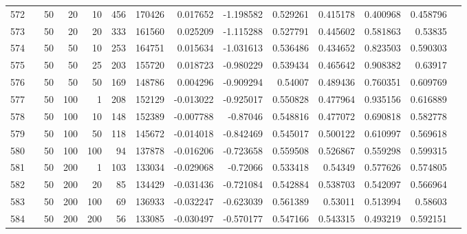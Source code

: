 \begin{longtable}{llrrrrrrrrrrrr}
		572 & &           50 &                20 &           10 &         456 &     170426 &  0.017652 & -1.198582 &  0.529261 &    0.415178 &       0.400968 &  0.458796 \\
		573 & &           50 &                20 &           20 &         333 &     161560 &  0.025209 & -1.115288 &  0.527791 &    0.445602 &       0.581863 &   0.53835 \\
		574 & &           50 &                50 &           10 &         253 &     164751 &  0.015634 & -1.031613 &  0.536486 &    0.434652 &       0.823503 &  0.590303 \\
		575 & &           50 &                50 &           25 &         203 &     155720 &  0.018723 & -0.980229 &  0.539434 &    0.465642 &       0.908382 &   0.63917 \\
		576 & &           50 &                50 &           50 &         169 &     148786 &  0.004296 & -0.909294 &   0.54007 &    0.489436 &       0.760351 &  0.609769 \\
		577 & &           50 &               100 &            1 &         208 &     152129 & -0.013022 & -0.925017 &  0.550828 &    0.477964 &       0.935156 &  0.616889 \\
		578 & &           50 &               100 &           10 &         148 &     152389 & -0.007788 &  -0.87046 &  0.548816 &    0.477072 &       0.690818 &  0.582778 \\
		579 & &           50 &               100 &           50 &         118 &     145672 & -0.014018 & -0.842469 &  0.545017 &    0.500122 &       0.610997 &  0.569618 \\
		580 & &           50 &               100 &          100 &          94 &     137878 & -0.016206 & -0.723658 &  0.559508 &    0.526867 &       0.559298 &  0.599315 \\
		581 & &           50 &               200 &            1 &         103 &     133034 & -0.029068 &  -0.72066 &  0.533418 &     0.54349 &       0.577626 &  0.574805 \\
		582 & &           50 &               200 &           20 &          85 &     134429 & -0.031436 & -0.721084 &  0.542884 &    0.538703 &       0.542097 &  0.566964 \\
		583 & &           50 &               200 &          100 &          69 &     136933 & -0.032247 & -0.623039 &  0.561389 &     0.53011 &       0.513994 &   0.58603 \\
		584 & &           50 &               200 &          200 &          56 &     133085 & -0.030497 & -0.570177 &  0.547166 &    0.543315 &       0.493219 &  0.592151 \\\midrule

\end{longtable}
